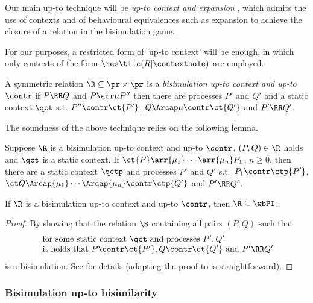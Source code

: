 Our main up-to technique will be
{\em up-to context and expansion} \cite{San93c},
which admits the use of contexts and of behavioural equivalences such as 
expansion to achieve the
closure of a relation in the bisimulation game.

For our purposes, a restricted form of 'up-to context' will be enough,
in which only contexts of the form $\res \tilc (R   |  \contexthole)$ are
employed.


\begin{definition}
  \label{d:uptp_sce}
  A symmetric relation $  \R   \subseteq \pr \times \pr $ is a 
  {\em bisimulation up-to context and up-to $\contr$ }
  if $P \RR Q$ and 
  $P \arr\mu P''$
  then there are processes  $P'$ and $Q'$ 
  and a static context $\qct$
  s.t. $ P'' \contr \ct {P'}$, 
  $Q \Arcap\mu  \contr \ct{Q'}$ and 
  $P'  \RR  Q'$.
\end{definition}


The soundness of the above technique relies on the following lemma.
\begin{lemma}
\label{l:uptocon-expa}
Suppose $ \R $ is a bisimulation up-to context and up-to $\contr$,
 $(P, Q) \in  \R $ holds and  $\qct$ is a 
 static context. 
If  $\ct{P}\arr{\mu_1} \cdots\arr{\mu_n}  P_1$, $n\geq 0$,
 then
there are a static context $\qctp$ and processes $P'$ and $Q'$
s.t.\  $P_1 \contr \ctp{P'}$, $\ct Q \Arcap{\mu_1} \cdots
\Arcap{\mu_n} \contr \ctp{Q'}$ and $P'  \RR  Q'$. 
\end{lemma} 

\begin{theorem}
\label{t:up-to-con-expa}
If $ \R  $  is a 
bisimulation up-to context and up-to $\contr$, then $ \R  \subseteq \wbPI$.
\end{theorem} 
 
\begin{proof}
By showing that  
the relation $\S$ containing 
all pairs $(P,Q)$ such that 
\[ \begin{array}{l}
 \mbox{ for some static context $\qct$ and
processes $P', Q'$} \\
 \mbox{ it holds that } P \contr \ct{P'}, Q \contr \ct{Q'} \mbox{ and }
P'  \RR  Q' %
 \end{array}
 \]
is a bisimulation. 
See \cite{San93c} for details (adapting the proof to \Intp is
straightforward).
\end{proof}

\subsubsection{Bisimulation up-to bisimilarity}
\label{ss:bisimulation_upto_wb}

